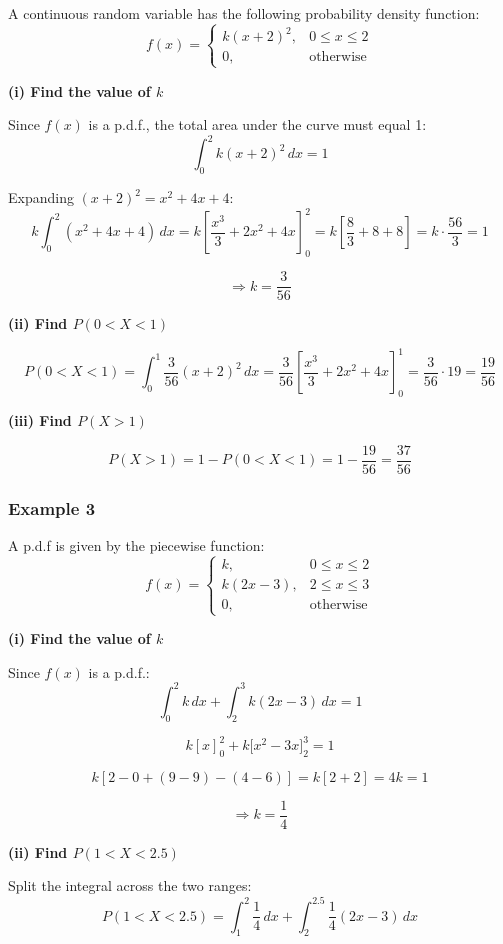 \documentclass[
]{article}
\begin{document}
A continuous random variable has the following probability density
function:
\[f(x) = \begin{cases} k(x+2)^2, & 0 \leq x \leq 2 \\ 0, & \text{otherwise} \end{cases}\]

\textbf{(i) Find the value of \(k\)}

Since \(f(x)\) is a p.d.f., the total area under the curve must equal 1:
\[\int_{0}^{2} k(x+2)^2\,dx = 1\]

Expanding \((x+2)^2 = x^2 + 4x + 4\):
\[k\int_{0}^{2}(x^2 + 4x + 4)\,dx = k\left[\frac{x^3}{3} + 2x^2 + 4x\right]_0^2 = k\left[\frac{8}{3} + 8 + 8\right] = k \cdot \frac{56}{3} = 1\]

\[\Rightarrow k = \frac{3}{56}\]

\textbf{(ii) Find \(P(0 < X < 1)\)}

\[P(0 < X < 1) = \int_{0}^{1} \frac{3}{56}(x+2)^2\,dx = \frac{3}{56}\left[\frac{x^3}{3} + 2x^2 + 4x\right]_0^1 = \frac{3}{56} \cdot 19 = \frac{19}{56}\]

\textbf{(iii) Find \(P(X > 1)\)}

\[P(X > 1) = 1 - P(0 < X < 1) = 1 - \frac{19}{56} = \frac{37}{56}\]

\subsubsection{Example 3}\label{example-3-1}

A p.d.f is given by the piecewise function:
\[f(x) = \begin{cases} k, & 0 \leq x \leq 2 \\ k(2x-3), & 2 \leq x \leq 3 \\ 0, & \text{otherwise} \end{cases}\]

\textbf{(i) Find the value of \(k\)}

Since \(f(x)\) is a p.d.f.:
\[\int_{0}^{2} k\,dx + \int_{2}^{3} k(2x-3)\,dx = 1\]

\[k[x]_0^2 + k\big[x^2 - 3x\big]_2^3 = 1\]

\[k[2-0 + (9-9)-(4-6)] = k[2+2] = 4k = 1\]

\[\Rightarrow k = \frac{1}{4}\]

\textbf{(ii) Find \(P(1 < X < 2.5)\)}

Split the integral across the two ranges:
\[P(1 < X < 2.5) = \int_{1}^{2}\frac{1}{4}\,dx + \int_{2}^{2.5}\frac{1}{4}(2x-3)\,dx\]
\end{document}
